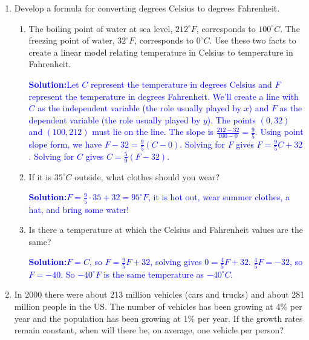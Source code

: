 \documentclass[letterpaper,11pt]{article}
\newcommand{\sol}[2]{\begin{minipage}[c][#1]{\linewidth}{\textcolor{blue}{\textbf{Solution:}}\quad \textcolor{blue}{#2}}\end{minipage}}
\newcommand{\sol}[2]{\begin{minipage}[c][#1]{\linewidth}{\vfill}\end{minipage}}
\begin{document}
\begin{enumerate}
\begin{enumerate}
\item From this graph, estimate the maximum revenue and the fare that will produce this maximum revenue.

\sol{.5 in}{Maximum revenue occurs at $x=137.5$. Maximum revenue is then $R(137.5)=416,328.125$. The fare charged when $x=137.5$ is $p(137.5)=9.125.$}
\end{enumerate}


\item Develop a formula for converting degrees Celsius to degrees Fahrenheit.
\begin{enumerate}
\item The boiling point of water at sea level, $212^{\circ}F$, corresponds to $100^{\circ}C$.  The freezing point of water, $32^{\circ}F$, corresponds to $0^{\circ}C$.  Use these two facts to create a linear model relating temperature in Celsius to temperature in Fahrenheit.

\sol{2in}{Let $C$ represent the temperature in degrees Celsius and $F$ represent the temperature in degrees Fahrenheit.  We'll create a line with $C$ as the independent variable (the role usually played by $x$) and $F$ as the dependent variable (the role usually played by $y$).  The points $(0, 32)$ and $(100, 212)$ must lie on the line.  The slope is $\frac{212-32}{100-0}=\frac{9}{5}$.  Using point slope form, we have $F-32 = \frac{9}{5}(C-0)$.  Solving for $F$ gives $F=\frac{9}{5}C+32$.  Solving for $C$ gives $C=\frac{5}{9}(F-32)$.}

\item  If it is $35^{\circ}C$ outside, what clothes should you wear?

\sol{.8in}{$F=\frac{9}{5}\cdot 35 + 32 = 95^{\circ}F$, it is hot out, wear summer clothes, a hat, and bring some water!} 

\item  Is there a temperature at which the Celsius and Fahrenheit values are the same?

\sol{1.5in}{$F=C$, so $F=\frac{9}{5}F+32$, solving gives $0 = \frac{4}{5}F + 32$.  $\frac{4}{5}F= -32$, so $F=-40$.  So $-40^{\circ}F$ is the same temperature as $-40^{\circ}C$.}

\end{enumerate}

\item  In 2000 there were about 213 million vehicles (cars and trucks) and about 281 million people in the US.  The number of vehicles has been growing at 4\% per year and the population has been growing at 1\% per year.  If the growth rates remain constant, when will there be, on average, one vehicle per person?


\end{enumerate}
\end{document}
